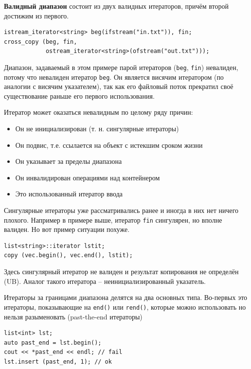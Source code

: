 \documentclass[a4paper,12pt,oneside]{article}
\begin{document}
\textbf{Валидный диапазон} состоит из двух валидных итераторов, причём второй достижим из первого.

\begin{lstlisting}
istream_iterator<string> beg(ifstream("in.txt")), fin;
cross_copy (beg, fin,
            ostream_iterator<string>(ofstream("out.txt")));
\end{lstlisting}

Диапазон, задаваемый в этом примере парой итераторов (\lstinline!beg!, \lstinline!fin!) невалиден, потому что невалиден итератор \lstinline!beg!. Он является висячим итератором (по аналогии с висячим указателем), так как его файловый поток прекратил своё существование раньше его первого использования.

Итератор может оказаться невалидным по целому ряду причин:

\begin{itemize}
\item Он не инициализирован (т. н. сингулярные итераторы)
\item Он подвис, т.е. ссылается на объект с истекшим сроком жизни
\item Он указывает за пределы диапазона
\item Он инвалидирован операциями над контейнером
\item Это использованный итератор ввода
\end{itemize}

Сингулярные итераторы уже рассматривались ранее и иногда в них нет ничего плохого. Например в примере выше, итератор \lstinline!fin! сингулярен, но вполне валиден. Но вот пример ситуации похуже.

\begin{lstlisting}
list<string>::iterator lstit;
copy (vec.begin(), vec.end(), lstit);
\end{lstlisting}

Здесь сингулярный итератор не валиден и результат копирования не определён (UB). Аналог такого итератора -- неинициализированный указатель.

Итераторы за границами диапазона делятся на два основных типа. Во-первых это итераторы, показывающие на \lstinline!end()! или \lstinline!rend()!, которые можно использовать но нельзя разыменовать (past-the-end итераторы) 

\begin{lstlisting}
list<int> lst;
auto past_end = lst.begin();
cout << *past_end << endl; // fail
lst.insert (past_end, 1); // ok
\end{lstlisting}
\end{document}
